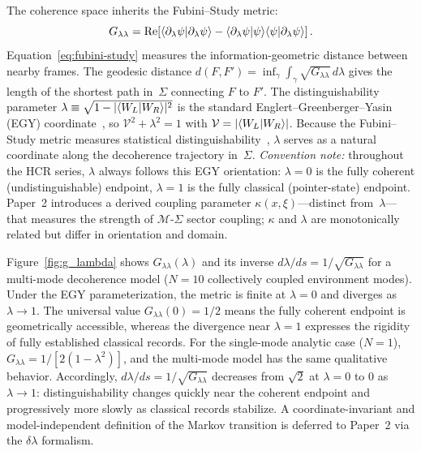\documentclass[aps,prd,twocolumn,superscriptaddress,nofootinbib,floatfix]{revtex4-2}
\newcommand{\Sig}{\Sigma}
\newcommand{\Gll}{G_{\lambda\lambda}}
\newcommand{\HCR}{HCR}
\begin{document}
The coherence space inherits the Fubini--Study metric:
\begin{equation}\label{eq:fubini-study}
\Gll = \mathrm{Re}\!\left[\braket{\partial_\lambda \psi | \partial_\lambda \psi} - \braket{\partial_\lambda \psi | \psi}\!\braket{\psi | \partial_\lambda \psi}\right].
\end{equation}
Equation~\eqref{eq:fubini-study} measures the information-geometric distance between nearby frames. The geodesic distance $d(F, F') = \inf_\gamma \int_\gamma \sqrt{\Gll}\, d\lambda$ gives the length of the shortest path in~$\Sig$ connecting $F$ to $F'$. The distinguishability parameter $\lambda \equiv \sqrt{1 - |\!\braket{W_L|W_R}\!|^2}$ is the standard Englert--Greenberger--Yasin (EGY) coordinate~\cite{GreenbergerYasin1988,Englert1996}, so $\mathcal{V}^2 + \lambda^2 = 1$ with $\mathcal{V} = |\!\braket{W_L|W_R}\!|$. Because the Fubini--Study metric measures statistical distinguishability~\cite{BraunsteinCaves1994}, $\lambda$ serves as a natural coordinate along the decoherence trajectory in~$\Sig$. \emph{Convention note:} throughout the \HCR{} series, $\lambda$ always follows this EGY orientation: $\lambda = 0$ is the fully coherent (undistinguishable) endpoint, $\lambda = 1$ is the fully classical (pointer-state) endpoint. Paper~2 introduces a derived coupling parameter $\kappa(x,\xi)$---distinct from~$\lambda$---that measures the strength of $\mathcal{M}$-$\Sig$ sector coupling; $\kappa$ and $\lambda$ are monotonically related but differ in orientation and domain.

Figure~\ref{fig:g_lambda} shows $\Gll(\lambda)$ and its inverse $d\lambda/ds = 1/\sqrt{\Gll}$ for a multi-mode decoherence model ($N=10$ collectively coupled environment modes). Under the EGY parameterization, the metric is finite at $\lambda = 0$ and diverges as $\lambda \to 1$. The universal value $\Gll(0) = 1/2$ means the fully coherent endpoint is geometrically accessible, whereas the divergence near $\lambda = 1$ expresses the rigidity of fully established classical records. For the single-mode analytic case ($N=1$), $\Gll = 1/[2(1-\lambda^2)]$, and the multi-mode model has the same qualitative behavior. Accordingly, $d\lambda/ds = 1/\sqrt{\Gll}$ decreases from $\sqrt{2}$ at $\lambda = 0$ to $0$ as $\lambda \to 1$: distinguishability changes quickly near the coherent endpoint and progressively more slowly as classical records stabilize. A coordinate-invariant and model-independent definition of the Markov transition is deferred to Paper~2 via the $\delta\lambda$ formalism.
\end{document}

